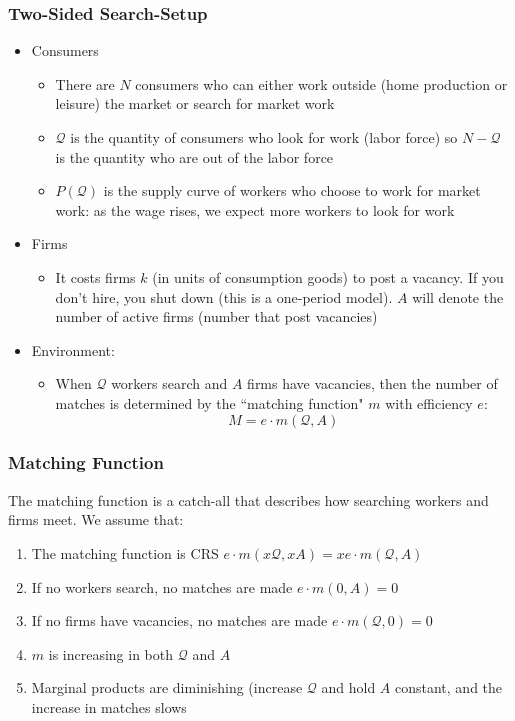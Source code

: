 \documentclass{beamer}
\begin{document}
\begin{frame}
\frametitle[alignment=center]{Two-Sided Search-Setup}
\begin{itemize}
\item Consumers
\begin{itemize}
\item There are $N$ consumers who can either work outside (home production or leisure) the market or search for market work
\bigskip
\item $\mathcal{Q}$ is the quantity of consumers who look for work (labor force) so $N-\mathcal{Q}$ is the quantity who are out of the labor force
\bigskip
\item $P(\mathcal{Q})$ is the supply curve of workers who choose to work for market work: as the wage rises, we expect more workers to look for work
\end{itemize}  
\item Firms
\begin{itemize}
\item It costs firms $k$ (in units of consumption goods) to post a vacancy.  If you don't hire, you shut down (this is a one-period model).  $A$ will denote the number of active firms (number that post vacancies)
\end{itemize}  
\item Environment:
\begin{itemize}
\item When $\mathcal{Q}$ workers search and $A$ firms have vacancies, then the number of matches is determined by the ``matching function" $m$ with efficiency $e$:
$$M=e\cdot m(\mathcal{Q},A)$$
\end{itemize}
\end{itemize}
\end{frame}

\begin{frame}
\frametitle[alignment=center]{Matching Function}
 The matching function is a catch-all that describes how searching workers and firms meet.  We assume that:
 \bigskip
 \begin{enumerate}
\item The matching function is CRS $e\cdot m(x\mathcal{Q},xA)=xe\cdot m(\mathcal{Q},A)$
 \bigskip
\item If no workers search, no matches are made $e\cdot m(0,A)=0$
 \bigskip
\item If no firms have vacancies, no matches are made $e\cdot m(\mathcal{Q},0)=0$
 \bigskip
\item $m$ is increasing in both $\mathcal{Q}$ and $A$
 \bigskip
\item Marginal products are diminishing (increase $\mathcal{Q}$ and hold $A$ constant, and the increase in matches slows
\end{enumerate}
\end{frame}
\end{document}

